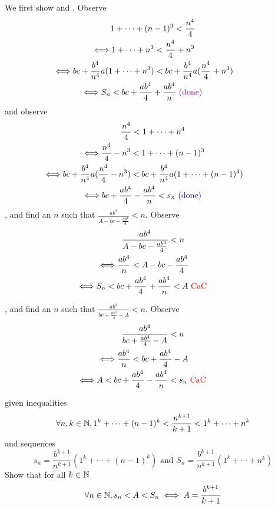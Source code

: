 \documentclass{report}
\begin{document}
\begin{solution}
We first show  and . Observe
\begin{gather}
1+\cdots +(n-1)^3<\frac{n^4}{4}\\
\liff 1+\cdots +n^3<\frac{n^4}{4}+n^3\\
\liff bc+\frac{b^4}{n^4}a(1+\cdots +n^3)<bc+\frac{b^4}{n^4}a(\frac{n^4}{4}+n^3)\\
\liff S_n<bc+\frac{ab^4}{4}+\frac{ab^4}{n} \vi{\text{ (done) }}
\end{gather}
and observe
\begin{gather}
\frac{n^4}{4}<1+\cdots +n^4\\
\liff \frac{n^4}{4}-n^3<1+\cdots +(n-1)^3\\
\liff bc+\frac{b^4}{n^4}a(\frac{n^4}{4}-n^3)<bc+\frac{b^4}{n^4}a(1+\cdots +(n-1)^3)\\
\liff bc+\frac{ab^4}{4}-\frac{ab^4}{n}<s_n\blue{\text{ (done) }}
\end{gather}
, and find an $n$ such that $\frac{ab^4}{A-bc-\frac{ab^4}{4}}<n$. Observe
\begin{gather}
\frac{ab^4}{A-bc-\frac{ab^4}{4}}<n\\
\liff \frac{ab^4}{n}<A-bc-\frac{ab^4}{4}\\
\liff S_n<bc+\frac{ab^4}{4}+\frac{ab^4}{n}<A\tCaC
\end{gather}

, and find an $n$ such that $\frac{ab^4}{bc+\frac{ab^4}{4}-A}<n$. Observe
\begin{gather}
\frac{ab^4}{bc+\frac{ab^4}{4}-A}<n\\
\liff \frac{ab^4}{n}<bc+\frac{ab^4}{4}-A\\
\liff A<bc+\frac{ab^4}{4}-\frac{ab^4}{n}<s_n\tCaC
\end{gather}
\end{solution}
\begin{question}{}{}
given inequalities 
\begin{equation}
\forall n,k\in \mathbb{N},  1^k+\cdots +(n-1)^k<\frac{n^{k+1}}{k+1}<1^k+\cdots +n^k
\end{equation}
and sequences
\begin{equation}
s_n=\frac{b^{k+1}}{n^{k+1}}(1^k+\cdots +(n-1)^k)\text{ and }S_n=\frac{b^{k+1}}{n^{k+1}}(1^k+\cdots +n^k)
\end{equation}
Show that for all $k\in\mathbb{N}$
\begin{equation}
\forall n\in\mathbb{N}, s_n<A<S_n\iff A=\frac{b^{k+1}}{k+1}
\end{equation}
\end{question}
\end{document}

